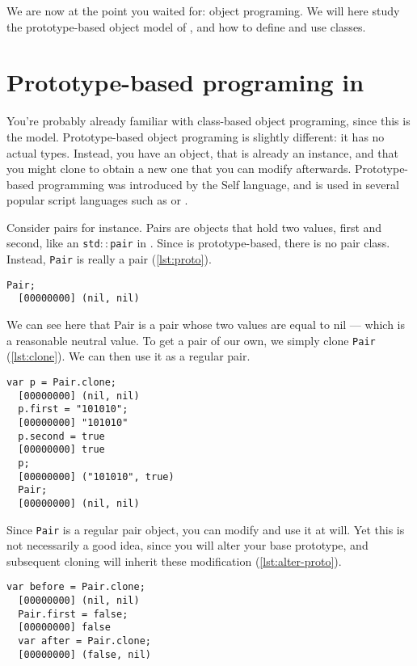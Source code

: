 \documentclass[openright,twoside,12pt]{report}
\newcommand{\lst}[1]{\autoref{lst:#1}}
\begin{document}
We are now at the point you waited for: object programing. We will
here study the prototype-based object model of \urbi, and how to
define and use classes.

\section{Prototype-based programing in \urbi}

You're probably already familiar with class-based object programing,
since this is the \Cxx model. Prototype-based object programing is
slightly different: it has no actual types. Instead, you have an
object, that is already an instance, and that you might clone to
obtain a new one that you can modify afterwards. Prototype-based
programming was introduced by the Self language, and is used in
several popular script languages such as \io or \js.

Consider pairs for instance. Pairs are objects that hold two values,
first and second, like an \texttt{std$::$pair} in \Cxx. Since \urbi is
prototype-based, there is no pair class. Instead, \lstinline|Pair| is
really a pair (\lst{proto}).

\begin{lstlisting}[caption=Prototypes in \urbi, label=lst:proto]
  Pair;
  [00000000] (nil, nil)
\end{lstlisting}

We can see here that Pair is a pair whose two values are equal to nil
--- which is a reasonable neutral value. To get a pair of our own, we
simply clone \lstinline|Pair| (\lst{clone}). We can then use it as a
regular pair.

\begin{lstlisting}[caption=Cloning, label=lst:clone]
  var p = Pair.clone;
  [00000000] (nil, nil)
  p.first = "101010";
  [00000000] "101010"
  p.second = true
  [00000000] true
  p;
  [00000000] ("101010", true)
  Pair;
  [00000000] (nil, nil)
\end{lstlisting}

Since \lstinline|Pair| is a regular pair object, you can modify and
use it at will. Yet this is not necessarily a good idea, since you
will alter your base prototype, and subsequent cloning will inherit
these modification (\lst{alter-proto}).

\begin{lstlisting}[caption=Altering a prototype, label=lst:alter-proto]
  var before = Pair.clone;
  [00000000] (nil, nil)
  Pair.first = false;
  [00000000] false
  var after = Pair.clone;
  [00000000] (false, nil)
\end{lstlisting}
\end{document}
